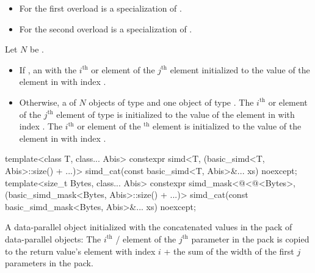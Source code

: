 \begin{itemdescr}

  \pnum\constraints
  \begin{itemize}
    \item For the first overload  is a specialization of .
    \item For the second overload  is a specialization of .
  \end{itemize}

  \pnum Let $N$ be .

    \pnum\returns
    \begin{itemize}
      \item If , an  with
        the $i^\text{th}$ \simd or \mask element of the $j^\text{th}$ 
        element initialized to the value of the element in  with index
        .

      \item Otherwise, a  of $N$ objects of type  and one
        object of type .
        The $i^\text{th}$ \simd or \mask element of the $j^\text{th}$
         element of type  is initialized to the value of
        the element in  with index .
        The $i^\text{th}$ \simd or \mask element of the $^\text{th}$
         element is initialized to the value of the element in
         with index .
    \end{itemize}
  \end{itemdescr}

\begin{itemdecl}
template<class T, class... Abis>
  constexpr simd<T, (basic_simd<T, Abis>::size() + ...)>
    simd_cat(const basic_simd<T, Abis>&... xs) noexcept;
template<size_t Bytes, class... Abis>
  constexpr simd_mask<@\deducet@<@\integerfrom@<Bytes>, (basic_simd_mask<Bytes, Abis>::size() + ...)>
    simd_cat(const basic_simd_mask<Bytes, Abis>&... xs) noexcept;

\end{itemdecl}

\begin{itemdescr}
  \pnum\returns
  A data-parallel object initialized with the concatenated values in the  pack of data-parallel objects: The $i^\text{th}$ / element of the $j^\text{th}$ parameter in the  pack is copied to the return value's element with index $i$ + the sum of the width of the first $j$ parameters in the  pack.
\end{itemdescr}

